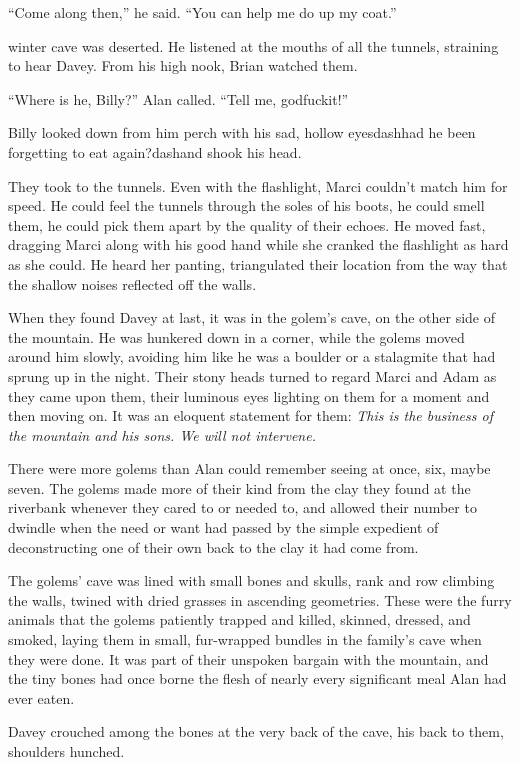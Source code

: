 ``Come along then,'' he said.  ``You can help me do up my coat.''

 winter cave was deserted.  He listened at the mouths of all the
tunnels, straining to hear Davey.  From his high nook, Brian watched
them.

``Where is he, Billy?'' Alan called.  ``Tell me, godfuckit!''

Billy looked down from him perch with his sad, hollow eyesdash{}had he
been forgetting to eat again?dash{}and shook his head.

They took to the tunnels.  Even with the flashlight, Marci couldn't
match him for speed.  He could feel the tunnels through the soles of
his boots, he could smell them, he could pick them apart by the
quality of their echoes.  He moved fast, dragging Marci along with his
good hand while she cranked the flashlight as hard as she could.  He
heard her panting, triangulated their location from the way that the
shallow noises reflected off the walls.

When they found Davey at last, it was in the golem's cave, on the
other side of the mountain.  He was hunkered down in a corner, while
the golems moved around him slowly, avoiding him like he was a boulder
or a stalagmite that had sprung up in the night.  Their stony heads
turned to regard Marci and Adam as they came upon them, their luminous
eyes lighting on them for a moment and then moving on.  It was an
eloquent statement for them:  \textit{This is the business of the
mountain and his sons.  We will not intervene.}

There were more golems than Alan could remember seeing at once, six,
maybe seven.  The golems made more of their kind from the clay they
found at the riverbank whenever they cared to or needed to, and
allowed their number to dwindle when the need or want had passed by
the simple expedient of deconstructing one of their own back to the
clay it had come from.

The golems' cave was lined with small bones and skulls, rank and row
climbing the walls, twined with dried grasses in ascending geometries. 
These were the furry animals that the golems patiently trapped and
killed, skinned, dressed, and smoked, laying them in small,
fur-wrapped bundles in the family's cave when they were done.  It was
part of their unspoken bargain with the mountain, and the tiny bones
had once borne the flesh of nearly every significant meal Alan had
ever eaten.

Davey crouched among the bones at the very back of the cave, his back
to them, shoulders hunched.

